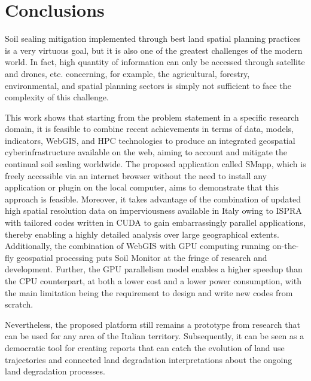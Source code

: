 \documentclass[APA,LATO1COL,doublespace]{WileyNJD-v2}
\begin{document}
\section{Conclusions}
Soil sealing mitigation implemented through best land spatial planning practices is a very virtuous goal, but it is also one of the greatest challenges of the modern world. 
In fact, high quantity of information can only be accessed through satellite and drones, etc. concerning, for example, the agricultural, forestry, environmental, and spatial planning sectors is simply not sufficient to face the complexity of this challenge.

This work shows that starting from the problem statement in a specific research domain, it is feasible to combine recent achievements in terms of data, models, indicators, WebGIS, and HPC technologies to produce an integrated geospatial cyberinfrastructure available on the web, aiming to account and mitigate the continual soil sealing worldwide. 
The proposed application called SMapp, which is freely accessible via an internet browser without the need to install any application or plugin on the local computer, aims to demonstrate that this approach is feasible. 
Moreover, it takes advantage of the combination of updated high spatial resolution data on imperviousness available in Italy owing to ISPRA with tailored codes written in CUDA to gain embarrassingly parallel applications, thereby enabling a highly detailed analysis over large geographical extents.
Additionally, the combination of WebGIS with GPU computing running on-the-fly geospatial processing puts Soil Monitor at the fringe of research and development. 
Further, the GPU parallelism model enables a higher speedup than the CPU counterpart, at both a lower cost and a lower power consumption, with the main limitation being the requirement to design and write new codes from scratch.

Nevertheless, the proposed platform still remains a prototype from research that can be used for any area of the Italian territory. 
Subsequently, it can be seen as a democratic tool for creating reports that can catch the evolution of land use trajectories and connected land degradation interpretations about the ongoing land degradation processes.
\end{document}
